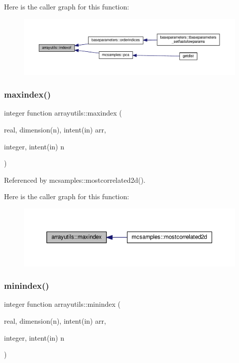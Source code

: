 Here is the caller graph for this function\+:
\nopagebreak
\begin{figure}[H]
\begin{center}
\leavevmode
\includegraphics[width=350pt]{namespacearrayutils_aa1aa3daae226441732e2e7c4f292eab2_icgraph}
\end{center}
\end{figure}
\mbox{\label{namespacearrayutils_ad2c5184ac408d5a352ea420ff3f1e1eb}} 
\subsubsection{\texorpdfstring{maxindex()}{maxindex()}}
{\footnotesize\ttfamily integer function arrayutils\+::maxindex (\begin{DoxyParamCaption}\item[{real, dimension(n), intent(in)}]{arr,  }\item[{integer, intent(in)}]{n }\end{DoxyParamCaption})}



Referenced by mcsamples\+::mostcorrelated2d().

Here is the caller graph for this function\+:
\nopagebreak
\begin{figure}[H]
\begin{center}
\leavevmode
\includegraphics[width=350pt]{namespacearrayutils_ad2c5184ac408d5a352ea420ff3f1e1eb_icgraph}
\end{center}
\end{figure}
\mbox{\label{namespacearrayutils_aba5bf237d7739646abd0596fea043455}} 
\subsubsection{\texorpdfstring{minindex()}{minindex()}}
{\footnotesize\ttfamily integer function arrayutils\+::minindex (\begin{DoxyParamCaption}\item[{real, dimension(n), intent(in)}]{arr,  }\item[{integer, intent(in)}]{n }\end{DoxyParamCaption})}

